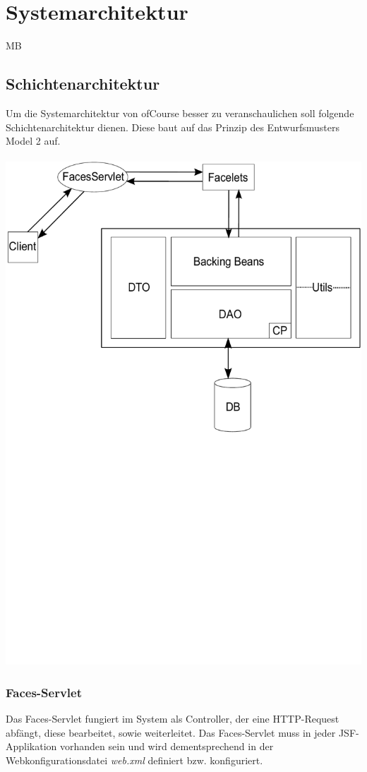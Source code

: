 \chapter{Systemarchitektur}
\begin{tiny}
MB
\end{tiny}
\section{Schichtenarchitektur}
	Um die Systemarchitektur von \glqq ofCourse\grqq{} besser zu veranschaulichen soll folgende Schichtenarchitektur dienen. Diese baut auf das Prinzip des Entwurfsmusters \glqq Model 2\grqq{} auf. \\ \\
    \includegraphics[scale=0.50]{Grafiken/Schichtenarchitektur.pdf}
	\subsection{Faces-Servlet}
	    Das Faces-Servlet fungiert im System als Controller, der eine HTTP-Request abfängt, diese bearbeitet, sowie weiterleitet. Das Faces-Servlet muss in jeder JSF-Applikation vorhanden sein und wird dementsprechend in der Webkonfigurationsdatei \textit{web.xml} definiert bzw. konfiguriert. 
